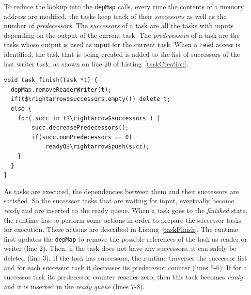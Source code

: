 To reduce the lookup into the \texttt{depMap} calls, every time the contents of a memory address are modified, the tasks keep track of their \textit{successors} as well as the number of \textit{predecessors}.
The \textit{successors} of a task are all the tasks with inputs depending on the output of the current task.
The \textit{predecessors} of a task are the tasks whose output is used as input for the current task.
When a \texttt{read} access is identified, the task that is being created is added to the list of successors of the last writer task, as shown on line 20 of Listing~\ref{taskCreation}.

\begin{lstlisting}[float, emph={task_finish}, caption={Pseudo-code for task$\_$finish runtime activity.},label=taskFinish]
void task_finish(Task *t) {
  depMap.removeReaderWriter(t);
  if(t$\rightarrow$successors.empty()) delete t;
  else {
    for( succ in t$\rightarrow$successors ) {
        succ.decreasePredecessors();
        if(succ.numPredecessors == 0) 
            readyQ$\rightarrow$push(succ);
    }
  }
}
\end{lstlisting}

As tasks are executed, the dependencies between them and their successors are satisfied. 
So the successor tasks that are waiting for input, eventually become \textit{ready} and are inserted to the ready queue.
When a task goes to the \textit{finished} state, the runtime has to perform some actions in order to prepare the successor tasks for execution.
These actions are described in Listing~\ref{taskFinish}.
The runtime first updates the \texttt{depMap} to remove the possible references of the task as reader or writer (line 2).
Then, if the task does not have any successors, it can safely be deleted (line 3).
If the task has successors, the runtime traverses the successor list and for each successor task it decreases its predecessor counter (lines 5-6).
If for a successor task its predecessor counter reaches zero, then this task becomes \textit{ready} and it is inserted in the \textit{ready queue} (lines 7-8).

